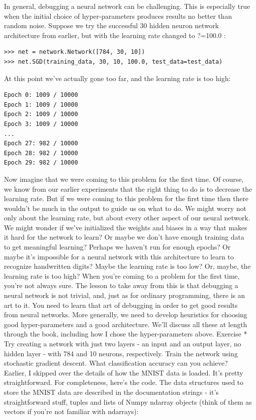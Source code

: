 In general, debugging a neural network can be challenging. This is especially true when the initial choice of hyper-parameters produces results no better than random noise. Suppose we try the successful 30 hidden neuron network architecture from earlier, but with the learning rate changed to ?=100.0
: 
\begin{lstlisting}
>>> net = network.Network([784, 30, 10])
>>> net.SGD(training_data, 30, 10, 100.0, test_data=test_data)
\end{lstlisting}
At this point we've actually gone too far, and the learning rate is too high:
\begin{lstlisting}
Epoch 0: 1009 / 10000
Epoch 1: 1009 / 10000
Epoch 2: 1009 / 10000
Epoch 3: 1009 / 10000
...
Epoch 27: 982 / 10000
Epoch 28: 982 / 10000
Epoch 29: 982 / 10000
\end{lstlisting}
Now imagine that we were coming to this problem for the first time. Of course, we know from our earlier experiments that the right thing to do is to decrease the learning rate. But if we were coming to this problem for the first time then there wouldn't be much in the output to guide us on what to do. We might worry not only about the learning rate, but about every other aspect of our neural network. We might wonder if we've initialized the weights and biases in a way that makes it hard for the network to learn? Or maybe we don't have enough training data to get meaningful learning? Perhaps we haven't run for enough epochs? Or maybe it's impossible for a neural network with this architecture to learn to recognize handwritten digits? Maybe the learning rate is too low? Or, maybe, the learning rate is too high? When you're coming to a problem for the first time, you're not always sure.
The lesson to take away from this is that debugging a neural network is not trivial, and, just as for ordinary programming, there is an art to it. You need to learn that art of debugging in order to get good results from neural networks. More generally, we need to develop heuristics for choosing good hyper-parameters and a good architecture. We'll discuss all these at length through the book, including how I chose the hyper-parameters above.
Exercise
* Try creating a network with just two layers - an input and an output layer, no hidden layer - with 784 and 10 neurons, respectively. Train the network using stochastic gradient descent. What classification accuracy can you achieve? 
Earlier, I skipped over the details of how the MNIST data is loaded. It's pretty straightforward. For completeness, here's the code. The data structures used to store the MNIST data are described in the documentation strings - it's straightforward stuff, tuples and lists of Numpy ndarray objects (think of them as vectors if you're not familiar with ndarrays):
